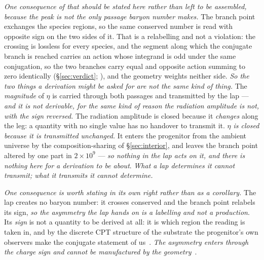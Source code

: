 \documentclass[11pt,a4paper]{article}
\theoremstyle{plain}
\theoremstyle{definition}
\theoremstyle{remark}
\begin{document}
\emph{One consequence of that should be stated here rather than left to be assembled, because the peak is not
the only passage baryon number makes.} The branch point exchanges the species regions, so the same conserved
number is read with opposite sign on the two sides of it. That is a relabelling and not a violation: the
crossing is lossless for every species, and the segment along which the conjugate branch is reached carries an
action whose integrand is odd under the same conjugation, so the two branches carry equal and opposite action
summing to zero identically (\S\ref{sec:verdict}; \cite{JanzenRange}), and the geometry weights neither side.
\emph{So the two things a derivation might be asked for are not the same kind of thing.} The \emph{magnitude}
of $\eta$ is carried through both passages and transmitted by the lap --- \emph{and it is not derivable, for the same
kind of reason the radiation amplitude is not, with the sign reversed.} The radiation amplitude is closed because it
\emph{changes} along the leg: a quantity with no single value has no handover to transmit it. \emph{$\eta$ is
closed because it is transmitted unchanged.} It enters the progenitor from the ambient universe by the
composition-sharing of \S\ref{sec:interior}, and leaves the branch point altered by one part in
$2\times10^{9}$ --- \emph{so nothing in the lap acts on it, and there is nothing here for a derivation to be
about}. \emph{What a lap determines it cannot transmit; what it transmits it cannot determine.}

\emph{One consequence is worth stating in its own right rather than as a corollary.} The lap creates no
baryon number: it crosses conserved and the branch point relabels its sign, \emph{so the asymmetry the lap
hands on is a labelling and not a production}. Its \emph{sign} is not a quantity to be derived at all: it is which region the reading is
taken in, and by the discrete CPT structure of the substrate the progenitor's own observers make the
conjugate statement of us~\cite{JanzenCRframework}. \emph{The asymmetry enters through the charge sign and
cannot be manufactured by the geometry}~\cite{JanzenRange}.
\end{document}

